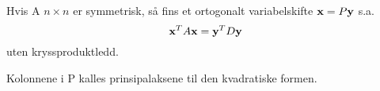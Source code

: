 Hvis A $n\times n$ er symmetrisk,
så fins et ortogonalt variabelskifte $\mathbf{x} = P\mathbf{y}$ s.a.
$$\mathbf{x}^TA\mathbf{x} = \mathbf{y}^TD\mathbf{y}$$
uten kryssproduktledd.

Kolonnene i P kalles prinsipalaksene til den kvadratiske formen.
